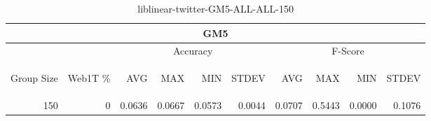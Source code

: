 \begin{center}
\begin{table}[htbp]
\begin{tabular}{ | r | r | r | r | r | r | r | r | r | r |}
\hline
\multicolumn{10}{|c|}{GM5}\\
\hline
 & & \multicolumn{4}{|c|}{Accuracy} & \multicolumn{4}{|c|}{F-Score}\\ \cline{3-10}
\begin{sideways}Group Size\end{sideways} & \begin{sideways}Web1T \%\end{sideways} & \begin{sideways}AVG\end{sideways} & \begin{sideways}MAX\end{sideways} & \begin{sideways}MIN\end{sideways} & \begin{sideways}STDEV\end{sideways} & \begin{sideways}AVG\end{sideways} & \begin{sideways}MAX\end{sideways} & \begin{sideways}MIN\end{sideways} & \begin{sideways}STDEV\end{sideways}\\
\hline
\multirow{0}{*}{150}
 & 0 & 0.0636 & 0.0667 & 0.0573 & 0.0044 & 0.0707 & 0.5443 & 0.0000 & 0.1076\\ \cline{2-10}
\hline
\end{tabular}
\caption{liblinear-twitter-GM5-ALL-ALL-150}
\label{table:liblinear-twitter-GM5-ALL-ALL-150}
\end{table}
\end{center}

